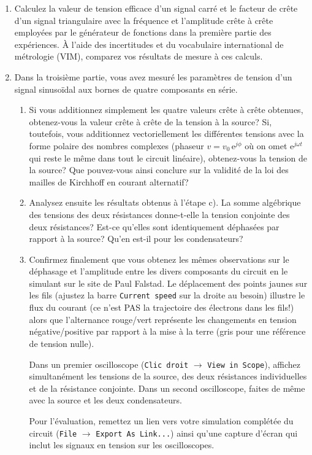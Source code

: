 \documentclass[canadien,12pt,oneside,letterpaper]{article}
\begin{document}
\begin{enumerate}
    \item Calculez la valeur de tension efficace d'un signal carré et le facteur de crête d'un signal triangulaire avec la fréquence et l'amplitude crête à crête employées par le générateur de fonctions dans la première partie des expériences. À l'aide des incertitudes et du vocabulaire international de métrologie (VIM), comparez vos résultats de mesure à ces calculs.
    \item Dans la troisième partie, vous avez mesuré les paramètres de tension d'un signal sinusoïdal aux bornes de quatre composants en série.
    \begin{enumerate}
        \item Si vous additionnez simplement les quatre valeurs crête à crête obtenues, obtenez-vous la valeur crête à crête de la tension à la source? Si, toutefois, vous additionnez vectoriellement les différentes tensions avec la forme polaire des nombres complexes (phaseur $v=v_0\,\textrm{e}^{j\phi}$ où on omet $\textrm{e}^{j\omega t}$ qui reste le même dans tout le circuit linéaire), obtenez-vous la tension de la source? Que pouvez-vous ainsi conclure sur la validité de la loi des mailles de Kirchhoff en courant alternatif?
        \item Analysez ensuite les résultats obtenus à l'étape c). La somme algébrique des tensions des deux résistances donne-t-elle la tension conjointe des deux résistances? Est-ce qu'elles sont identiquement déphasées par rapport à la source? Qu'en est-il pour les condensateurs?
        \item Confirmez finalement que vous obtenez les mêmes observations sur le déphasage et l'amplitude entre les divers composants du circuit en le simulant sur le site de Paul Falstad. Le déplacement des points jaunes sur les fils (ajustez la barre \texttt{Current speed} sur la droite au besoin) illustre le flux du courant (ce n'est PAS la trajectoire des électrons dans les fils!) alors que l'alternance rouge/vert représente les changements en tension négative/positive par rapport à la mise à la terre (gris pour une référence de tension nulle).\par
        Dans un premier oscilloscope (\texttt{Clic droit} $\rightarrow$ \texttt{View in Scope}), affichez simultanément les tensions de la source, des deux résistances individuelles et de la résistance conjointe. Dans un second oscilloscope, faites de même avec la source et les deux condensateurs.\par
        Pour l'évaluation, remettez un lien vers votre simulation complétée du circuit (\texttt{File} $\rightarrow$ \texttt{Export As Link...}) ainsi qu'une capture d'écran qui inclut les signaux en tension sur les oscilloscopes.\par

\end{enumerate}
\end{enumerate}
\end{document}
